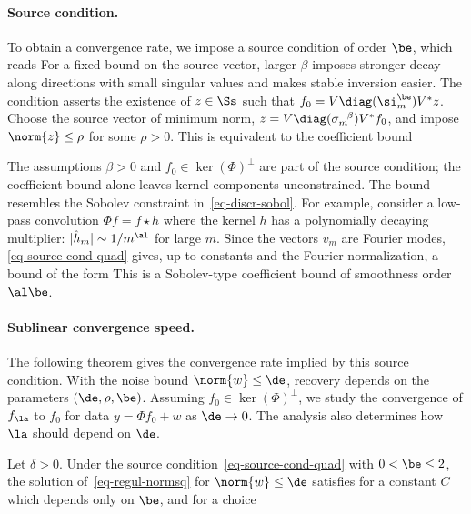 \paragraph{Source condition.}

To obtain a convergence rate, we impose a source condition of order $\be$, which reads
For a fixed bound on the source vector, larger $\beta$ imposes stronger decay along directions with small singular values and makes stable inversion easier.
The condition asserts the existence of $z\in\Ss$ such that $f_0 = V \diag( \si_m^{\be} ) V^* z$. Choose the source vector of minimum norm, $z=V\diag(\sigma_m^{-\beta})V^*f_0$, and impose $\norm{z} \leq \rho$ for some $\rho>0$. This is equivalent to the coefficient bound


The assumptions $\beta>0$ and $f_0\in\ker(\Phi)^\bot$ are part of the source condition; the coefficient bound alone leaves kernel components unconstrained. The bound resembles the Sobolev constraint in~\ref{eq-discr-sobol}. For example, consider a low-pass convolution $\Phi f = f \star h$ where the kernel $h$ has a polynomially decaying multiplier: $|\hat h_m| \sim 1/m^{\al}$ for large $m$. Since the vectors $v_m$ are Fourier modes, \eqref{eq-source-cond-quad} gives, up to constants and the Fourier normalization, a bound of the form
This is a Sobolev-type coefficient bound of smoothness order $\al\be$.


\paragraph{Sublinear convergence speed.}

The following theorem gives the convergence rate implied by this source condition.
%
With the noise bound $\norm{w} \leq \de$, recovery depends on the parameters $(\de,\rho,\be)$. Assuming $f_0 \in \ker(\Phi)^\bot$, we study the convergence of $f_\la$ to $f_0$ for data $y=\Phi f_0+w$ as $\de \rightarrow 0$. The analysis also determines how $\la$ should depend on $\de$.


\begin{thm}\label{thm-sublin-quad}
	Let $\delta>0$. Under the source condition~\eqref{eq-source-cond-quad} with $0 < \be \leq 2$, the solution of~\eqref{eq-regul-normsq} for $\norm{w} \leq \de$ satisfies
	for a constant $C$ which depends only on $\be$, and
	for a choice 
\end{thm}

